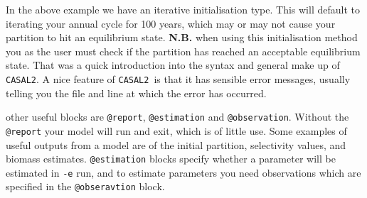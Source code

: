 \documentclass[12pt]{article}
\makeatletter
\newcommand{\cas}{\texttt{CASAL2}}
\newcommand{\command}[1] {\texttt{@#1}}
\makeatother
\begin{document}
In the above example we have an iterative initialisation type. This will default to iterating your annual cycle for 100 years, which may or may not cause your partition to hit an equilibrium state. \textbf{N.B.} when using this initialisation method you as the user must check if the partition has reached an acceptable equilibrium state. That was a quick introduction into the syntax and general make up of \cas. A nice feature of \cas\ is that it has sensible error messages, usually telling you the file and line at which the error has occurred.

other useful blocks are \command{report}, \command{estimation} and \command{observation}. Without the \command{report} your model will run and exit, which is of little use. Some examples of useful outputs from a model are of the initial partition, selectivity values, and biomass estimates. \command{estimation} blocks specify whether a parameter will be estimated in \texttt{-e} run, and to estimate parameters you need observations which are specified in the \command{obseravtion} block.
\end{document}
